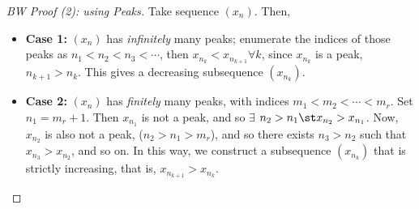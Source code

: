 \documentclass[12pt]{article}
\begin{document}
\begin{proof}[BW Proof (2): using Peaks]
  Take sequence $(x_n)$. Then,
  \begin{itemize}
    \item \textbf{Case 1:} $(x_n)$ has \textit{infinitely} many peaks; enumerate the indices of those peaks as $n_1 < n_2 < n_3 < \cdots$, then $x_{n_k} < x_{n_{k+1}} \forall k$, since $x_{n_k}$ is a peak, $n_{k+1} > n_k$.  This gives a decreasing subsequence $(x_{n_k})$.
    \item \textbf{Case 2:} $(x_n)$ has \textit{finitely} many peaks, with indices $m_1 < m_2 < \cdots < m_r$. Set $n_1 = m_r + 1$. Then $x_{n_1}$ is not a peak, and so $\exists$ $n_2 > n_1 \st x_{n_2} > x_{n_1}$. Now, $x_{n_2}$ is also not a peak, ($n_2 > n_1 > m_r$), and so there exists $n_3 > n_2$ such that $x_{n_3} > x_{n_2}$, and so on. In this way, we construct a subsequence $(x_{n_k})$ that is strictly increasing, that is, $x_{n_{k+1}} > x_{n_k}$.
  \end{itemize}
\end{proof}




















\end{document}
